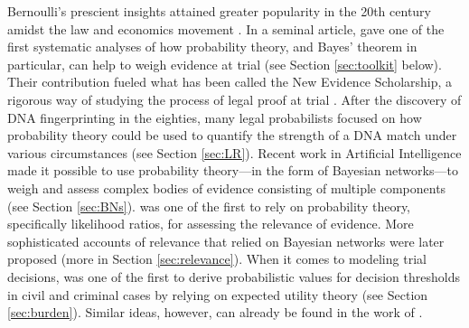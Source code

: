 \documentclass{article}
\begin{document}
Bernoulli's prescient insights attained greater popularity in the 20th century amidst the law and economics movement \citep{Calabresi1961, becker1968crime, Posner1973}. 
In a seminal article, \cite{Finkelstein1970A}
gave one of the first systematic analyses of how probability theory, and Bayes' theorem in particular, 
can help to weigh evidence at trial (see Section \ref{sec:toolkit} below). Their contribution fueled what has been called the New Evidence  Scholarship, a rigorous way of studying the process of legal proof at trial \citep{Lempert1986}. After the discovery of DNA fingerprinting in the eighties, many legal probabilists focused on how probability theory could be used to quantify the strength of a DNA match under various circumstances (see Section \ref{sec:LR}).
Recent work in Artificial Intelligence made it possible to use probability theory---in the form of Bayesian networks---to weigh and assess complex bodies of evidence consisting of multiple components  (see Section  \ref{sec:BNs}). 
%
 \cite{lempert1977modeling}
was one of the first to rely on probability theory, specifically likelihood ratios, 
for assessing the relevance of evidence.
More sophisticated accounts of relevance that relied on Bayesian networks were later proposed  (more in Section \ref{sec:relevance}).
%
When it comes to modeling trial decisions, \cite{kaplan1968decision} was one of the first to derive probabilistic values for decision thresholds in civil and criminal cases by relying on expected utility theory (see Section \ref{sec:burden}). Similar ideas, however,  can already be found in the work of \cite{Laplace1814}.
\end{document}
